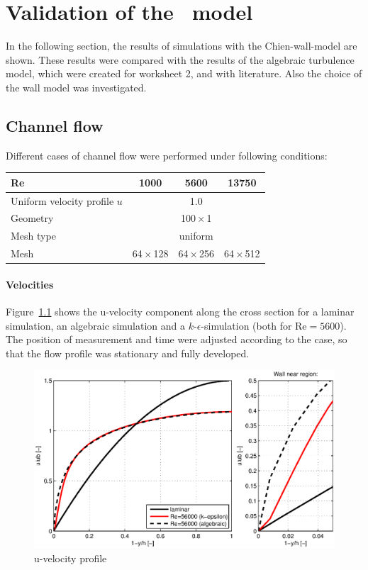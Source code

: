 \chapter{Validation of the \ke\, model} %
\label{cha:validation_of_k_epsilon_model}

In the following section, the results of simulations with the Chien-wall-model are shown. These results were compared with the results of the algebraic turbulence model, which were created for worksheet 2, and with literature. Also the choice of the wall model was investigated.

\section{Channel flow} %
\label{sec:channel_flow}

Different cases of channel flow were performed under following conditions:

\begin{center}
\begin{tabular}{lccc}
\hline 
Re        & 1000 & 5600 & 13750\\\hline         
Uniform velocity profile $u$         & \multicolumn{3}{c}{1.0}\\
Geometry  & \multicolumn{3}{c}{100\,$\times$\,1} \\
Mesh type & \multicolumn{3}{c}{uniform} \\
Mesh      & 64\,$\times$\,128 & 64\,$\times$\,256 & 64\,$\times$\,512 \\\hline 
\end{tabular}
\end{center}

\subsubsection*{Velocities}

Figure~\ref{fig:channel-u-profile} shows the u-velocity component along the cross section for a laminar simulation, an algebraic simulation and a $k$-$\epsilon$-simulation (both for Re$=5600$). The position of measurement and time were adjusted according to the case, so that the flow profile was stationary and fully developed.

\begin{figure}[!htb]
\centering
\includegraphics[width=1.0\textwidth]{FIGURES/vprofile.eps}
\caption{u-velocity profile}
\label{fig:channel-u-profile}
\end{figure} 


